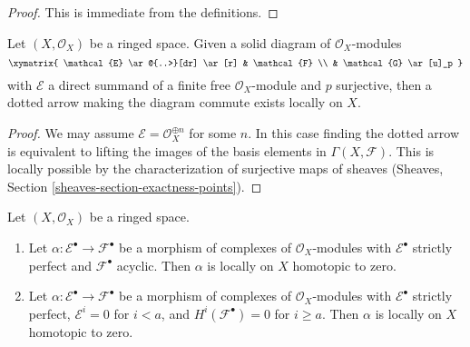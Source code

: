 \begin{proof}
This is immediate from the definitions.
\end{proof}

\begin{lemma}
\label{lemma-local-lift-map}
Let $(X, \mathcal{O}_X)$ be a ringed space.
Given a solid diagram of $\mathcal{O}_X$-modules
$$
\xymatrix{
\mathcal{E} \ar@{..>}[dr] \ar[r] & \mathcal{F} \\
& \mathcal{G} \ar[u]_p
}
$$
with $\mathcal{E}$ a direct summand of a finite free
$\mathcal{O}_X$-module and $p$ surjective, then a dotted arrow
making the diagram commute exists locally on $X$.
\end{lemma}

\begin{proof}
We may assume $\mathcal{E} = \mathcal{O}_X^{\oplus n}$ for some $n$.
In this case finding the dotted arrow is equivalent to lifting the
images of the basis elements in $\Gamma(X, \mathcal{F})$. This is
locally possible by the characterization of surjective maps of
sheaves (Sheaves, Section \ref{sheaves-section-exactness-points}).
\end{proof}

\begin{lemma}
\label{lemma-local-homotopy}
Let $(X, \mathcal{O}_X)$ be a ringed space.
\begin{enumerate}
\item Let $\alpha : \mathcal{E}^\bullet \to \mathcal{F}^\bullet$
be a morphism of complexes of $\mathcal{O}_X$-modules
with $\mathcal{E}^\bullet$ strictly perfect and $\mathcal{F}^\bullet$
acyclic. Then $\alpha$ is locally on $X$ homotopic to zero.
\item Let $\alpha : \mathcal{E}^\bullet \to \mathcal{F}^\bullet$
be a morphism of complexes of $\mathcal{O}_X$-modules
with $\mathcal{E}^\bullet$ strictly perfect, $\mathcal{E}^i = 0$
for $i < a$, and $H^i(\mathcal{F}^\bullet) = 0$ for $i \geq a$.
Then $\alpha$ is locally on $X$ homotopic to zero.
\end{enumerate}
\end{lemma}

